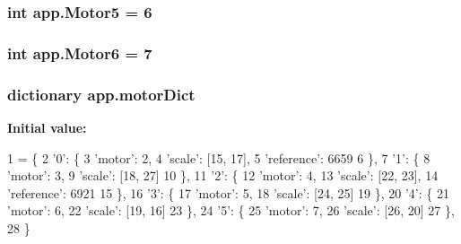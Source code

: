 \subsubsection[{\texorpdfstring{Motor5}{Motor5}}]{\setlength{\rightskip}{0pt plus 5cm}int app.\+Motor5 = 6}\hypertarget{namespaceapp_a41d12b4f17d0237187a159d9b29a170e}{}\label{namespaceapp_a41d12b4f17d0237187a159d9b29a170e}
\subsubsection[{\texorpdfstring{Motor6}{Motor6}}]{\setlength{\rightskip}{0pt plus 5cm}int app.\+Motor6 = 7}\hypertarget{namespaceapp_a76b0edea929abf9452e693fd7051aee7}{}\label{namespaceapp_a76b0edea929abf9452e693fd7051aee7}
\subsubsection[{\texorpdfstring{motor\+Dict}{motorDict}}]{\setlength{\rightskip}{0pt plus 5cm}dictionary app.\+motor\+Dict}\hypertarget{namespaceapp_a5054105e3b8d0ee96b3cc04a14a09373}{}\label{namespaceapp_a5054105e3b8d0ee96b3cc04a14a09373}
{\bfseries Initial value\+:}
\begin{DoxyCode}
1 = \{
2         \textcolor{stringliteral}{'0'}: \{
3             \textcolor{stringliteral}{'motor'}: 2,
4             \textcolor{stringliteral}{'scale'}: [15, 17],
5             \textcolor{stringliteral}{'reference'}: 6659
6             \},
7         \textcolor{stringliteral}{'1'}: \{
8             \textcolor{stringliteral}{'motor'}: 3,
9             \textcolor{stringliteral}{'scale'}: [18, 27]
10             \},
11         \textcolor{stringliteral}{'2'}: \{
12             \textcolor{stringliteral}{'motor'}: 4,
13             \textcolor{stringliteral}{'scale'}: [22, 23],
14             \textcolor{stringliteral}{'reference'}: 6921
15             \},
16         \textcolor{stringliteral}{'3'}: \{
17             \textcolor{stringliteral}{'motor'}: 5,
18             \textcolor{stringliteral}{'scale'}: [24, 25]
19             \},
20         \textcolor{stringliteral}{'4'}: \{
21             \textcolor{stringliteral}{'motor'}: 6,
22             \textcolor{stringliteral}{'scale'}: [19, 16]
23             \},
24         \textcolor{stringliteral}{'5'}: \{
25             \textcolor{stringliteral}{'motor'}: 7,
26             \textcolor{stringliteral}{'scale'}: [26, 20]
27             \},
28         \}
\end{DoxyCode}
